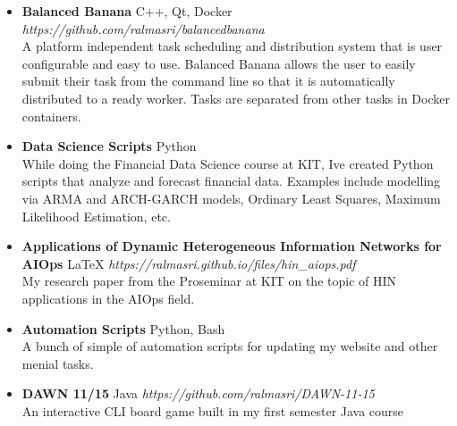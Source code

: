 \documentclass[11pt]{article}
\newcommand{\project}[4]{ \vspace{1.5mm}
  \textbf{#1} #2 \hfill \textit{#3}#4 \vspace{1.5mm}
}
\begin{document}
	      \begin{itemize}[leftmargin=*]
	      	\item[]
	      	      \project
	      	      {Balanced Banana}
	      	      {C++, Qt, Docker}
	      	      {https://github.com/ralmasri/balancedbanana}
	      	      {\\A platform independent task scheduling and distribution system that is user configurable and easy to use. Balanced Banana allows the user to easily submit their task from the command line so that it is automatically distributed to a ready worker. Tasks are separated from other tasks in Docker containers.}
	      	\item[]
	      	      \project
	      	      {Data Science Scripts}
	      	      {Python}
	      	      {}
	      	      {\\While doing the Financial Data Science course at KIT, I\textquotesingle{}ve created Python scripts that analyze and forecast financial data. Examples include modelling via ARMA and ARCH-GARCH models, Ordinary Least Squares, Maximum Likelihood Estimation, etc.}
	      	\item[]
	      	      \project
	      	      {Applications of Dynamic Heterogeneous Information Networks for AIOps}
	      	      {LaTeX}
	      	      {https://ralmasri.github.io/files/hin\_aiops.pdf}
	      	      {\\My research paper from the Proseminar at KIT on the topic of HIN applications in the AIOps field.}
	      	\item[]
	      	      \project
	      	      {Automation Scripts}
	      	      {Python, Bash}
	      	      {}
	      	      {\\A bunch of simple of automation scripts for updating my website and other menial tasks.}
	      	\item[]
	      	      \project
	      	      {DAWN 11/15}
	      	      {Java}
	      	      {https://github.com/ralmasri/DAWN-11-15}
	      	      {\\An interactive CLI board game built in my first semester Java course}
	      \end{itemize}
	      
	      \ 
\end{document}
